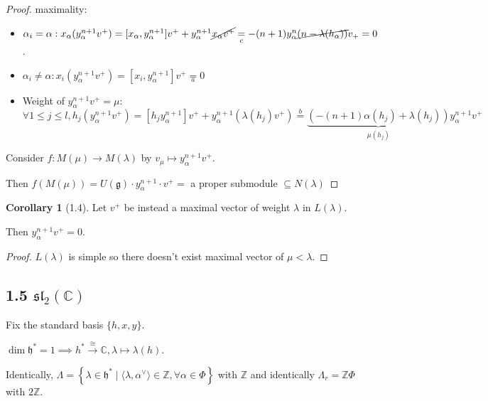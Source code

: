 \documentclass{article}
\theoremstyle{definition}
\newtheorem{corollary}[theorem]{Corollary}
\begin{document}
    \begin{proof}
        maximality:

        \begin{itemize}
            \item \(\alpha_i = \alpha : x_\alpha(y_\alpha^{n+1} v^+) = [x_\alpha, y_\alpha^{n+1}]v^+ + y_\alpha^{n+1} \cancel{x_\alpha v^+} \underset{c}{=} -(n+1)y_\alpha^n \cancel{(n-\lambda(h_\alpha))}v_+ = 0\).
            \item \(\alpha_i \neq \alpha: x_i(y_\alpha^{n+1} v^+) = [x_i, y_\alpha^{n+1}]v^+ \underset{a}{=} 0\) 
            \item Weight of \(y_\alpha^{n+1} v^+ = \mu\): \(\forall 1 \leq j \leq l, h_j(y_\alpha^{n+1} v^+)=[h_j y_\alpha^{n+1}]v^+ + y_\alpha^{n+1} (\lambda(h_j)v^+) \overset{b}{=} \underbrace{(-(n+1)\alpha(h_j) + \lambda(h_j))}_{\mu(h_j)} y_\alpha^{n+1} v^+\) 
        \end{itemize} 

        Consider \(f: M(\mu) \to M(\lambda)\) by \(v_\mu \mapsto y_\alpha^{n+1} v^+\).
        
        Then \(f(M(\mu))=U(\mathfrak{g}) \cdot y_\alpha^{n+1} \cdot v^+=\) a proper submodule \(\subseteq N(\lambda)\)  
    \end{proof}

    \begin{corollary}
        [1.4] Let \(v^+\) be instead a maximal vector of weight \(\lambda\) in \(L(\lambda)\).

        Then \(y_\alpha^{n+1} v^+ = 0\).
    \end{corollary}

    \begin{proof}
        \(L(\lambda)\) is simple so there doesn't exist maximal vector of \(\mu < \lambda\).
    \end{proof}

    \subsection*{1.5 \(\mathfrak{sl}_2(\mathbb{C})\)}

    Fix the standard basis \(\{ h,x,y \}\).

    \(\dim \mathfrak{h}^{\ast} = 1 \implies h^{\ast} \xrightarrow{\cong} \mathbb{C} , \lambda \mapsto \lambda(h)\).

    Identically, \(\Lambda = \left\{ \lambda \in \mathfrak{h}^{\ast} \mid \langle \lambda, \alpha^\vee \rangle \in \mathbb{Z}, \forall \alpha \in \Phi \right\}\) with \(\mathbb{Z}\) and identically \(\Lambda_r = \mathbb{Z} \Phi\) with \(2\mathbb{Z}\).
    
\end{document}
